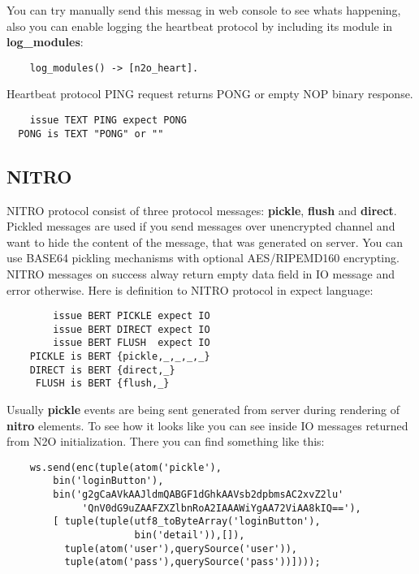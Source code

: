 You can try manually send this messag in web console to see whats happening,
also you can enable logging the heartbeat protocol by including its
module in {\bf log\_modules}:

\vspace{1\baselineskip}
\begin{lstlisting}
    log_modules() -> [n2o_heart].
\end{lstlisting}
\vspace{1\baselineskip}

Heartbeat protocol PING request returns PONG or empty NOP binary response.

\vspace{1\baselineskip}
\begin{lstlisting}
    issue TEXT PING expect PONG
  PONG is TEXT "PONG" or ""
\end{lstlisting}
\vspace{1\baselineskip}


\newpage
\subsection{NITRO}

NITRO protocol consist of three protocol messages: {\bf pickle}, {\bf flush} and {\bf direct}.
Pickled messages are used if you send messages over unencrypted
channel and want to hide the content of the message,
that was generated on server. You can use BASE64 pickling mechanisms
with optional AES/RIPEMD160 encrypting. NITRO messages on success alway
return empty data field in IO message and
error otherwise. Here is definition to NITRO protocol in expect language:

\vspace{1\baselineskip}
\begin{lstlisting}
        issue BERT PICKLE expect IO
        issue BERT DIRECT expect IO
        issue BERT FLUSH  expect IO
    PICKLE is BERT {pickle,_,_,_,_}
    DIRECT is BERT {direct,_}
     FLUSH is BERT {flush,_}
\end{lstlisting}
\vspace{1\baselineskip}

Usually {\bf pickle} events are being sent generated from server during
rendering of {\bf nitro} elements. To see how it looks like you can see
inside IO messages returned from N2O initialization. There you can find
something like this:

\vspace{1\baselineskip}
\begin{lstlisting}
    ws.send(enc(tuple(atom('pickle'),
        bin('loginButton'),
        bin('g2gCaAVkAAJldmQABGF1dGhkAAVsb2dpbmsAC2xvZ2lu'
             'QnV0dG9uZAAFZXZlbnRoA2IAAAWiYgAA72ViAA8kIQ=='),
        [ tuple(tuple(utf8_toByteArray('loginButton'),
                      bin('detail')),[]),
          tuple(atom('user'),querySource('user')),
          tuple(atom('pass'),querySource('pass'))])));
\end{lstlisting}
\vspace{1\baselineskip}

